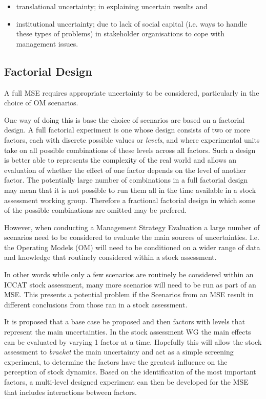 \documentclass[a4paper,10pt]{article}
\begin{document}
\begin{itemize}
 \item translational uncertainty; in explaining uncertain results and 
 \item institutional uncertainty; due to lack of social capital (i.e. ways to handle these types of problems) in stakeholder organisations 
to cope with management issues. 
\end{itemize}

\subsection*{Factorial Design}

A full MSE requires appropriate uncertainty to be considered, particularly in the choice of OM scenarios. 
 
One way of doing this is base the choice of scenarios are based on a factorial design.  A full factorial experiment is one whose 
design consists of two or more factors, each with discrete possible values or \textit{levels}, and where experimental 
units take on all possible combinations of these levels across all factors. Such a design is better able to
represents the complexity of the real world and allows an evaluation of whether the effect of one factor
depends on the level of another factor. The potentially large number of combinations in a full factorial design 
may mean that it is not possible to run them all in the time available in a stock assessment working group.
Therefore a fractional factorial design in which some of the possible combinations are omitted may be prefered.

However, when conducting a Management Strategy Evaluation a large number of scenarios need to be considered to
evaluate the main sources of uncertainties. I.e. the Operating Models (OM) will need to be 
conditioned on a wider range of data and knowledge that routinely considered within a stock assessment. 

In other words while only a few scenarios are routinely be considered within an ICCAT stock assessment, many more 
scenarios will need to be run as part of an MSE. This presents a potential problem if
the Scenarios from an MSE result in different conclusions from those ran in a stock assessment.

It is proposed that a base case be proposed and then factors with levels that represent the main uncertainties. In the
stock assessment WG the main effects can be evaluated by varying 1 factor at a time. Hopefully this will 
allow the stock assessment to \textit{bracket} the main uncertainty and act as a simple screening experiment, 
to determine the factors have the greatest influence on the perception of stock dynamics.
Based on the identification of the most important factors, a multi-level designed experiment can then be developed
for the MSE that includes interactions between factors.

\newpage\clearpage
 
 
\end{document}
